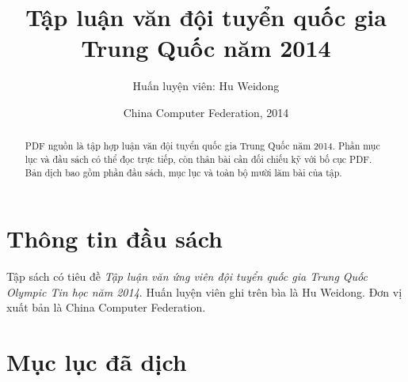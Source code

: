 \documentclass[11pt]{article}
\title{Tập luận văn đội tuyển quốc gia Trung Quốc năm 2014}
\author{Huấn luyện viên: Hu Weidong}
\date{China Computer Federation, 2014}
\begin{document}
\maketitle


\renewcommand{\abstractname}{Tóm tắt}
\begin{abstract}
PDF nguồn là tập hợp luận văn đội tuyển quốc gia Trung Quốc năm 2014. Phần
mục lục và đầu sách có thể đọc trực tiếp, còn thân bài cần đối chiếu kỹ với
bố cục PDF. Bản dịch bao gồm phần đầu sách, mục lục và toàn bộ mười lăm bài
của tập.
\end{abstract}

\section{Thông tin đầu sách}

Tập sách có tiêu đề \emph{Tập luận văn ứng viên đội tuyển quốc gia Trung Quốc
Olympic Tin học năm 2014}. Huấn luyện viên ghi trên bìa là Hu Weidong. Đơn vị
xuất bản là China Computer Federation.

\section{Mục lục đã dịch}
\end{document}
